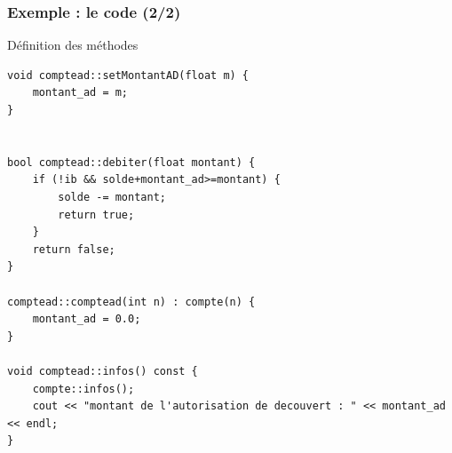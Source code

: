 \begin{frame}[fragile]\frametitle{Exemple : le code (2/2)}
\begin{codeblock}{Définition des méthodes}
\begin{lstlisting}
void comptead::setMontantAD(float m) {
    montant_ad = m;
}


bool comptead::debiter(float montant) {
    if (!ib && solde+montant_ad>=montant) {
        solde -= montant;
        return true;
    }
    return false;
}

comptead::comptead(int n) : compte(n) {
    montant_ad = 0.0;
}

void comptead::infos() const {
    compte::infos();
    cout << "montant de l'autorisation de decouvert : " << montant_ad << endl;
}
\end{lstlisting}
\end{codeblock}

\end{frame}
